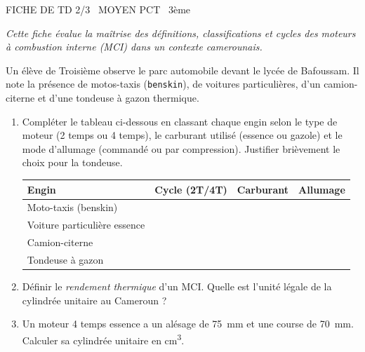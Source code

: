 \documentclass[11pt]{article}
\begin{document}
\begin{tcolorbox}[enhanced,colback=popink,colframe=popink,arc=10pt,boxrule=0pt,left=12pt,right=12pt,top=9pt,bottom=9pt]
{\color{white}\popxbold\small FICHE DE TD 2/3 \textbullet\ MOYEN \hfill PCT \textbullet\ 3ème\par}
\end{tcolorbox}
\vspace{4pt}
\emph{Cette fiche évalue la maîtrise des définitions, classifications et cycles des moteurs à combustion interne (MCI) dans un contexte camerounais.}

\begin{exercice}
Un élève de Troisième observe le parc automobile devant le lycée de Bafoussam. Il note la présence de motos-taxis (\texttt{benskin}), de voitures particulières, d'un camion-citerne et d'une tondeuse à gazon thermique.

\begin{enumerate}
    \item Compléter le tableau ci-dessous en classant chaque engin selon le type de moteur (2 temps ou 4 temps), le carburant utilisé (essence ou gazole) et le mode d'allumage (commandé ou par compression). Justifier brièvement le choix pour la tondeuse.
    
    \begin{tabular}{|l|c|c|c|}
    \hline
    \textbf{Engin} & \textbf{Cycle (2T/4T)} & \textbf{Carburant} & \textbf{Allumage} \\
    \hline
    Moto-taxis (benskin) & & & \\
    \hline
    Voiture particulière essence & & & \\
    \hline
    Camion-citerne & & & \\
    \hline
    Tondeuse à gazon & & & \\
    \hline
    \end{tabular}
    
    \item Définir le \emph{rendement thermique} d'un MCI. Quelle est l'unité légale de la cylindrée unitaire au Cameroun ?
    \item Un moteur 4 temps essence a un alésage de \SI{75}{\milli\meter} et une course de \SI{70}{\milli\meter}. Calculer sa cylindrée unitaire en \si{\centi\meter\cubed}.
\end{enumerate}
\end{exercice}
\end{document}

